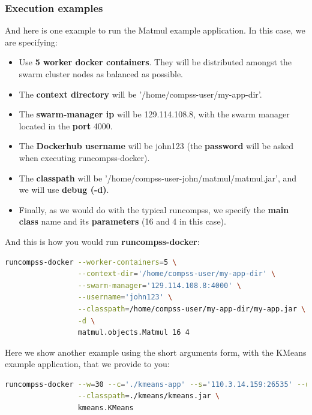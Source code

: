 \subsubsection{Execution examples}
And here is one example to run the Matmul example application. 
In this case, we are specifying:

\begin{itemize}  
\item Use \textbf{5 worker docker containers}. They will be distributed amongst the swarm cluster nodes as balanced as possible.
\item The \textbf{context directory} will be '/home/compss-user/my-app-dir'.
\item The \textbf{swarm-manager ip} will be 129.114.108.8, with the swarm manager located in the \textbf{port} 4000.
\item The \textbf{Dockerhub username} will be john123 (the \textbf{password} will be asked when executing runcompss-docker).
\item The \textbf{classpath} will be '/home/compss-user-john/matmul/matmul.jar', and we will use \textbf{debug (-d)}.
\item Finally, as we would do with the typical runcompss, we specify the \textbf{main class} name and its \textbf{parameters} (16 and 4 in this case).
\end{itemize}
And this is how you would run \textbf{runcompss-docker}:
\begin{lstlisting}[language=bash]
runcompss-docker --worker-containers=5 \
                 --context-dir='/home/compss-user/my-app-dir' \
                 --swarm-manager='129.114.108.8:4000' \
                 --username='john123' \
                 --classpath=/home/compss-user/my-app-dir/my-app.jar \
                 -d \
                 matmul.objects.Matmul 16 4
\end{lstlisting}           

Here we show another example using the short arguments form, with the KMeans example application, that we provide to you:
\begin{lstlisting}[language=bash]
runcompss-docker --w=30 --c='./kmeans-app' --s='110.3.14.159:26535' --u='test1947' \
                 --classpath=./kmeans/kmeans.jar \
                 kmeans.KMeans
\end{lstlisting}           



\clearpage

